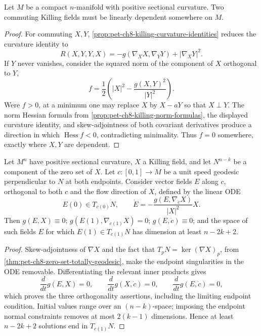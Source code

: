\begin{theorem}
  \label{thm:pet-ch8-grove-searle-commuting-dependent}

  Let $M$ be a compact $n$-manifold with positive sectional curvature. Two
  commuting Killing fields must be linearly dependent somewhere on $M$.
\end{theorem}
\begin{proof}
  \sketch
  For commuting \(X,Y\), \cref{prop:pet-ch8-killing-curvature-identities}
  reduces the curvature identity to
  \[
    R(X,Y,Y,X)=-g(\nabla_XX,\nabla_YY)+|\nabla_XY|^2.
  \]
  If \(Y\) never vanishes, consider the squared norm of the component of \(X\)
  orthogonal to \(Y\),
  \[
    f=\frac12\left(|X|^2-\frac{g(X,Y)^2}{|Y|^2}\right).
  \]
  Were \(f>0\), at a minimum one may replace \(X\) by \(X-aY\) so that
  \(X\perp Y\). The norm Hessian formula from
  \cref{prop:pet-ch8-killing-norm-formulas}, the displayed curvature identity,
  and skew-adjointness of both covariant derivatives produce a direction in
  which \(\operatorname{Hess}f<0\), contradicting minimality. Thus \(f=0\)
  somewhere, exactly where \(X,Y\) are dependent.
\end{proof}

\begin{lemma}
  \label{lem:pet-ch8-jacobi-type-field}

  Let $M^n$ have positive sectional curvature, $X$ a Killing field, and let
  $N^{n-k}$ be a component of the zero set of $X$. Let $c:[0,1]\to M$ be a unit
  speed geodesic perpendicular to $N$ at both endpoints. Consider vector fields
  $E$ along $c$, orthogonal to both $c$ and the flow direction of $X$, defined
  by the linear ODE
  \[
    E(0)\in T_{c(0)}N,\qquad
    \dot E=-\frac{g(E,\nabla_{\dot c}X)}{|X|^2}X.
  \]
  Then $g(E,X)\equiv0$; $g(E(1),\nabla_{\dot c(1)}X)=0$; $g(E,\dot c)\equiv0$;
  and the space of such fields $E$ for which $E(1)\in T_{c(1)}N$ has dimension
  at least $n-2k+2$.
\end{lemma}
\begin{proof}
  \sketch
  Skew-adjointness of \(\nabla X\) and the fact that
  \(T_pN=\ker(\nabla X)_p\), from
  \cref{thm:pet-ch8-zero-set-totally-geodesic}, make the endpoint singularities
  in the ODE removable. Differentiating the relevant inner products gives
  \[
    \frac d{dt}g(E,X)=0,\qquad
    \frac d{dt}g(X,\dot c)=0,\qquad
    \frac d{dt}g(E,\dot c)=0,
  \]
  which proves the three orthogonality assertions, including the limiting
  endpoint condition. Initial values range over an \((n-k)\)-space; imposing
  the endpoint normal constraints removes at most \(2(k-1)\) dimensions.
  Hence at least \(n-2k+2\) solutions end in \(T_{c(1)}N\).
\end{proof}

